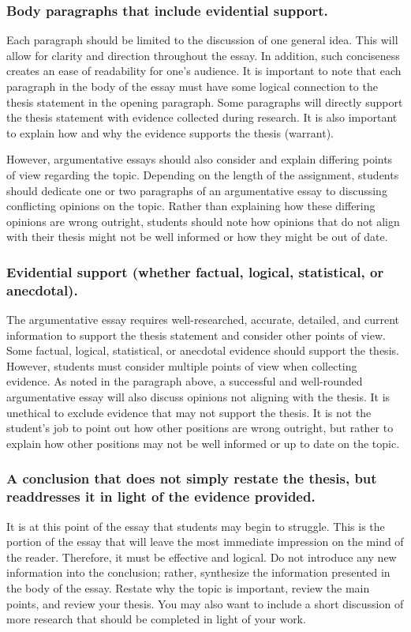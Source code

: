 	\subsubsection{Body paragraphs that include evidential support.}
		Each paragraph should be limited to the discussion of one general idea. This will allow for clarity and direction throughout the essay. In addition, such conciseness creates an ease of readability for one’s audience. It is important to note that each paragraph in the body of the essay must have some logical connection to the thesis statement in the opening paragraph. Some paragraphs will directly support the thesis statement with evidence collected during research. It is also important to explain how and why the evidence supports the thesis (warrant).
		
		However, argumentative essays should also consider and explain differing points of view regarding the topic. Depending on the length of the assignment, students should dedicate one or two paragraphs of an argumentative essay to discussing conflicting opinions on the topic. Rather than explaining how these differing opinions are wrong outright, students should note how opinions that do not align with their thesis might not be well informed or how they might be out of date.
	
	\subsubsection{Evidential support (whether factual, logical, statistical, or anecdotal).}
		The argumentative essay requires well-researched, accurate, detailed, and current information to support the thesis statement and consider other points of view. Some factual, logical, statistical, or anecdotal evidence should support the thesis. However, students must consider multiple points of view when collecting evidence. As noted in the paragraph above, a successful and well-rounded argumentative essay will also discuss opinions not aligning with the thesis. It is unethical to exclude evidence that may not support the thesis. It is not the student’s job to point out how other positions are wrong outright, but rather to explain how other positions may not be well informed or up to date on the topic.
	
	\subsubsection{A conclusion that does not simply restate the thesis, but readdresses it in light of the evidence provided.}
		It is at this point of the essay that students may begin to struggle. This is the portion of the essay that will leave the most immediate impression on the mind of the reader. Therefore, it must be effective and logical. Do not introduce any new information into the conclusion; rather, synthesize the information presented in the body of the essay. Restate why the topic is important, review the main points, and review your thesis. You may also want to include a short discussion of more research that should be completed in light of your work.
	
